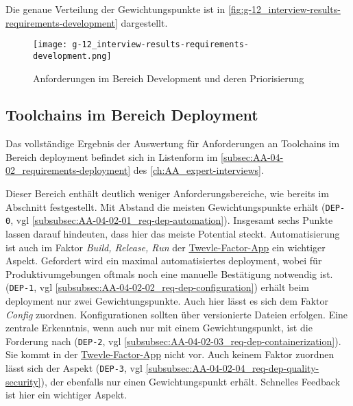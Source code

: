 Die genaue Verteilung der Gewichtungspunkte ist in \autoref{fig:g-12_interview-results-requirements-development} dargestellt.

\begin{figure}[h]
    \centering
    \texttt{[image: g-12\_interview-results-requirements-development.png]}
    \caption{Anforderungen im Bereich Development und deren Priorisierung}
    \label{fig:g-12_interview-results-requirements-development}
\end{figure}

\subsection{Toolchains im Bereich Deployment}
\label{subsec:04-02-03_toolchains-in-deployment}

Das vollständige Ergebnis der Auswertung für Anforderungen an Toolchains im Bereich \Gls{deployment} befindet sich in Listenform im \autoref{subsec:AA-04-02_requirements-deployment} des \autoref{ch:AA_expert-interviews}.

Dieser Bereich enthält deutlich weniger Anforderungsbereiche, wie bereits im Abschnitt  festgestellt. Mit Abstand die meisten Gewichtungspunkte erhält \textbf{} (\texttt{DEP-0}, \acrshort{vgl} \autoref{subsubsec:AA-04-02-01_req-dep-automation}). Insgesamt sechs Punkte lassen darauf hindeuten, dass hier das meiste Potential steckt. Automatisierung ist auch im Faktor \textit{Build, Release, Run} der \hyperref[sec:03-05_concept-of-twelve-factor-app]{Twevle-Factor-App} ein wichtiger Aspekt. Gefordert wird ein maximal automatisiertes \Gls{deployment}, wobei für Produktivumgebungen oftmals noch eine manuelle Bestätigung notwendig ist. \textbf{} (\texttt{DEP-1}, \acrshort{vgl} \autoref{subsubsec:AA-04-02-02_req-dep-configuration}) erhält beim \Gls{deployment} nur zwei Gewichtungspunkte. Auch hier lässt es sich dem Faktor \textit{Config} zuordnen. Konfigurationen sollten über versionierte Dateien erfolgen. Eine zentrale Erkenntnis, wenn auch nur mit einem Gewichtungspunkt, ist die Forderung nach \textbf{} (\texttt{DEP-2}, \acrshort{vgl} \autoref{subsubsec:AA-04-02-03_req-dep-containerization}). Sie kommt in der \hyperref[sec:03-05_concept-of-twelve-factor-app]{Twevle-Factor-App} nicht vor. Auch keinem Faktor zuordnen lässt sich der Aspekt \textbf{} (\texttt{DEP-3}, \acrshort{vgl} \autoref{subsubsec:AA-04-02-04_req-dep-quality-security}), der ebenfalls nur einen Gewichtungspunkt erhält. Schnelles Feedback ist hier ein wichtiger Aspekt.

